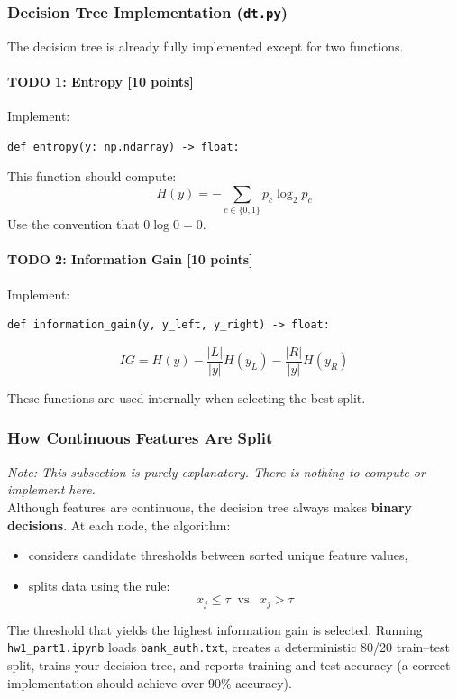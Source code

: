 \documentclass{homework}
\begin{document}
\subsubsection{Decision Tree Implementation (\texttt{dt.py})}

The decision tree is already fully implemented except for two functions.

\paragraph{TODO 1: Entropy [10 points]}
Implement:
\begin{verbatim}
def entropy(y: np.ndarray) -> float:
\end{verbatim}

This function should compute:
\[
H(y) = -\sum_{c \in \{0,1\}} p_c \log_2 p_c
\]
Use the convention that $0 \log 0 = 0$.

\paragraph{TODO 2: Information Gain [10 points]}
Implement:
\begin{verbatim}
def information_gain(y, y_left, y_right) -> float:
\end{verbatim}

\[
IG = H(y) - \frac{|L|}{|y|} H(y_L) - \frac{|R|}{|y|} H(y_R)
\]

These functions are used internally when selecting the best split.

\subsubsection{How Continuous Features Are Split}
\textit{Note: This subsection is purely explanatory. There is nothing to compute or implement here.}\\
Although features are continuous, the decision tree always makes \textbf{binary decisions}.
At each node, the algorithm:
\begin{itemize}
    \item considers candidate thresholds between sorted unique feature values,
    \item splits data using the rule:
    \[
    x_j \le \tau \;\; \text{vs.} \;\; x_j > \tau
    \]
\end{itemize}
The threshold that yields the highest information gain is selected. Running \texttt{hw1\_part1.ipynb} loads \texttt{bank\_auth.txt}, creates a deterministic 80/20 train--test split, trains your decision tree, and reports training and test accuracy (a correct implementation should achieve over 90\% accuracy).
\end{document}
